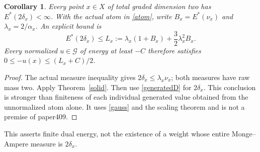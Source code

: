 \documentclass[11pt]{article}
\newtheorem{corollary}[theorem]{Corollary}
\newcommand{\G}{\mathcal G}
\begin{document}
\begin{corollary}\label{dirac}
Every point $x\in X$ of total graded dimension two has
$E^*(2\delta_x)<\infty$. With the actual atom in \eqref{atom},
write $B_x=E^*(\nu_x)$ and $\lambda_x=2/\alpha_x$.
An explicit bound is
\begin{equation}\label{Lx}
 E^*(2\delta_x)\le L_x:=
             \lambda_x(1+B_x)+\frac32\lambda_x^2B_x.
\end{equation}
Every normalized $u\in\G$ of energy at least $-C$ therefore satisfies
$0\le-u(x)\le(L_x+C)/2$.
\end{corollary}
\begin{proof}
The actual measure inequality gives $2\delta_x\le\lambda_x\nu_x$;
both measures have raw mass two. Apply Theorem~\ref{solid}.
Then use \eqref{generatedD} for $2\delta_x$. This conclusion is
stronger than finiteness of each individual generated value obtained
from the unnormalized atom alone. It uses \eqref{gauss} and the
scaling theorem and is not a premise of paper409.
\end{proof}
This asserts finite dual energy, not the existence of a weight whose
entire Monge--Ampere measure is $2\delta_x$.
\end{document}

